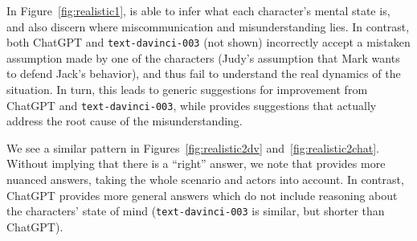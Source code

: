 In Figure~\ref{fig:realistic1}, {\DV} is able to infer what each character's mental state is, and also discern where miscommunication and misunderstanding lies. In contrast, both ChatGPT and \texttt{text-davinci-003} (not shown) incorrectly accept a mistaken assumption made by one of the characters (Judy's assumption that Mark wants to defend Jack's behavior), and thus fail to understand the real dynamics of the situation.
In turn, this leads to generic suggestions for improvement from ChatGPT and \texttt{text-davinci-003}, while {\DV} provides suggestions that actually address the root cause of the misunderstanding.

We see a similar pattern in Figures~\ref{fig:realistic2dv} and~\ref{fig:realistic2chat}. Without implying that there is a ``right'' answer, we note that {\DV} provides more nuanced answers, taking the whole scenario and actors into account. In contrast, ChatGPT provides more general answers which do not include reasoning about the characters' state of mind (\texttt{text-davinci-003} is similar, but shorter than ChatGPT).

